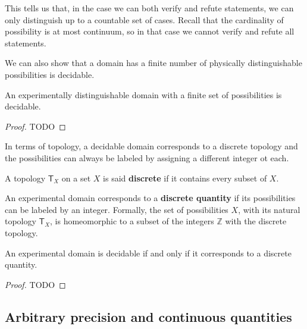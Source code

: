 \documentclass[11pt,letterpaper,fleqn]{memoir} %
\begin{document}
This tells us that, in the case we can both verify and refute statements, we can only distinguish up to a countable set of cases. Recall that the cardinality of possibility is at most continuum, so in that case we cannot verify and refute all statements.

We can also show that a domain has a finite number of physically distinguishable possibilities is decidable.

\begin{mathSection}
	
	\begin{prop}
		An experimentally distinguishable domain with a finite set of possibilities is decidable.
	\end{prop}
	
	\begin{proof}
		TODO
	\end{proof}
	
\end{mathSection}

In terms of topology, a decidable domain corresponds to a discrete topology and the possibilities can always be labeled by assigning a different integer ot each.

\begin{mathSection}
	
	\begin{defn}
		A topology $\mathsf{T}_X$ on a set $X$ is said \textbf{discrete} if it contains every subset of $X$.
	\end{defn}
	
	\begin{defn}
		An experimental domain corresponds to a \textbf{discrete quantity} if its possibilities can be labeled by an integer. Formally, the set of possibilities $X$, with its natural topology $\mathsf{T}_X$, is homeomorphic to a subset of the integers $\mathbb{Z}$ with the discrete topology.
	\end{defn}
	
	\begin{prop}
		An experimental domain is decidable if and only if it corresponds to a discrete quantity.
	\end{prop}
	
	\begin{proof}
		TODO
	\end{proof}	
\end{mathSection}

\subsection{Arbitrary precision and continuous quantities}
\end{document}
